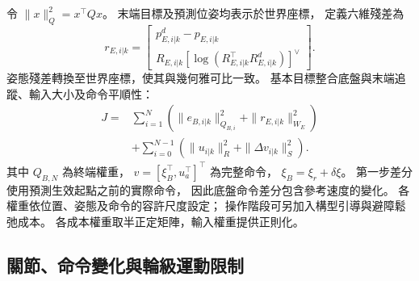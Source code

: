 令 $\|x\|_Q^2=x^\top Qx$。
末端目標及預測位姿均表示於世界座標，
定義六維殘差為
\begin{equation}
    r_{E,i|k}=
    \begin{bmatrix}
        p_{E,i|k}^{d}-p_{E,i|k}\\
        R_{E,i|k}
        [\log(R_{E,i|k}^{\top}R_{E,i|k}^{d})]^\vee
    \end{bmatrix}.
    \label{eq:ch3_tcp_pose_residual}
\end{equation}
姿態殘差轉換至世界座標，使其與幾何雅可比一致。
基本目標整合底盤與末端追蹤、輸入大小及命令平順性：
\begin{equation}
    \begin{aligned}
        J={}&\sum_{i=1}^{N}
        \left(\|e_{B,i|k}\|_{Q_{B,i}}^2+
              \|r_{E,i|k}\|_{W_E}^2\right)\\
        &+\sum_{i=0}^{N-1}
        \left(\|u_{i|k}\|_R^2+
              \|\Delta v_{i|k}\|_S^2\right).
    \end{aligned}
    \label{eq:ch3_wholebody_objective}
\end{equation}
其中 $Q_{B,N}$ 為終端權重，
$v=[\xi_B^\top,u_a^\top]^\top$ 為完整命令，
$\xi_B=\xi_r+\delta\xi$。
第一步差分使用預測生效起點之前的實際命令，
因此底盤命令差分包含參考速度的變化。
各權重依位置、姿態及命令的容許尺度設定；
操作階段可另加入構型引導與避障鬆弛成本。
各成本權重取半正定矩陣，輸入權重提供正則化。

\subsection{關節、命令變化與輪級運動限制}
\label{subsec:joint_command_wheel_constraints}

